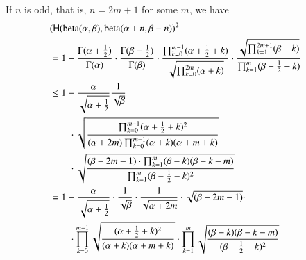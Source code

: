 \documentclass[runningheads,a4paper]{llncs}
\begin{document}
If $n$ is odd, that is, $n = 2m + 1$ for some $m$, we have 
\begin{align*}
\lefteqn{
( \hlg(\mathrm{beta}(\alpha,\beta),\mathrm{beta}(\alpha+n,\beta-n))^2
}\\
&=
1 - \frac{\Gamma(\alpha+\frac{1}{2})}{\Gamma(\alpha)} \cdot
\frac{\Gamma(\beta - \frac{1}{2})}{\Gamma(\beta)}
\cdot \frac{\prod_{k = 0}^{m-1}(\alpha + \frac{1}{2}+ k)}{\sqrt{\prod_{k = 0}^{2m}(\alpha + k) }} 
\cdot \frac{\sqrt{\prod_{k = 1}^{2m+1}(\beta - k)}}{\prod_{k = 1}^{m}(\beta - \frac{1}{2} -  k)}\\
&\leq
1 - \frac{\alpha}{\sqrt{\alpha + \frac{1}{2}}} \frac{1}{\sqrt{\beta}}\\
&\qquad \cdot \sqrt{\frac{\prod_{k = 0}^{m-1}(\alpha + \frac{1}{2} + k)^2}{(\alpha + 2m)\prod_{k = 0}^{m-1}(\alpha + k)(\alpha + m  + k)}}\\
&\qquad \cdot 
\sqrt{ \frac{(\beta - 2m - 1)\cdot \prod_{k = 1}^{m}(\beta - k)(\beta - k - m) }{\prod_{k = 1}^{m}(\beta - \frac{1}{2}- k)^2}}
\\
&=
1 - \frac{\alpha}{\sqrt{\alpha + \frac{1}{2}}} \cdot \frac{1}{\sqrt{\beta}} \cdot \frac{1}{\sqrt{\alpha + 2m}} \cdot \sqrt{(\beta - 2m - 1)}\cdot \\
&\qquad \cdot 
\prod_{k = 0}^{m-1}
\sqrt{\frac{(\alpha + \frac{1}{2} + k)^2}{(\alpha + k)(\alpha + m  + k)}} \cdot 
\prod_{k = 1}^{m} \sqrt{\frac{(\beta - k)(\beta - k - m)}{(\beta - \frac{1}{2}- k)^2}}
\\
\end{align*}
\end{document}
